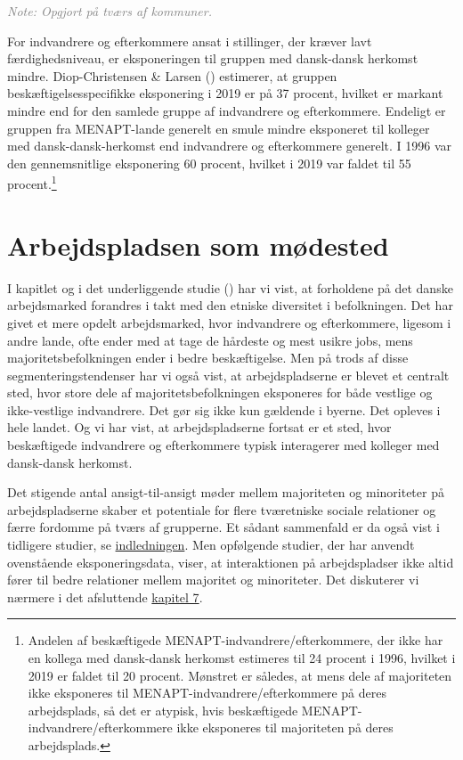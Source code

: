 \documentclass[
]{book}
\begin{document}
\begin{footnotesize}\textit{\textcolor{gray}{
Note: Opgjort på tværs af kommuner.
}}
\end{footnotesize}

For indvandrere og efterkommere ansat i stillinger, der kræver lavt færdighedsniveau, er eksponeringen til gruppen med dansk-dansk herkomst mindre. Diop-Christensen \& Larsen () estimerer, at gruppen beskæftigelsesspecifikke eksponering i 2019 er på 37 procent, hvilket er markant mindre end for den samlede gruppe af indvandrere og efterkommere. Endeligt er gruppen fra MENAPT-lande generelt en smule mindre eksponeret til kolleger med dansk-dansk-herkomst end indvandrere og efterkommere generelt. I 1996 var den gennemsnitlige eksponering 60 procent, hvilket i 2019 var faldet til 55 procent.\footnote{Andelen af beskæftigede MENAPT-indvandrere/efterkommere, der ikke har en kollega med dansk-dansk herkomst estimeres til 24 procent i 1996, hvilket i 2019 er faldet til 20 procent. Mønstret er således, at mens dele af majoriteten ikke eksponeres til MENAPT-indvandrere/efterkommere på deres arbejdsplads, så det er atypisk, hvis beskæftigede MENAPT-indvandrere/efterkommere ikke eksponeres til majoriteten på deres arbejdsplads.}

\section{Arbejdspladsen som mødested}\label{arbejdspladsen-som-muxf8dested}

I kapitlet og i det underliggende studie () har vi vist, at forholdene på det danske arbejdsmarked forandres i takt med den etniske diversitet i befolkningen. Det har givet et mere opdelt arbejdsmarked, hvor indvandrere og efterkommere, ligesom i andre lande, ofte ender med at tage de hårdeste og mest usikre jobs, mens majoritetsbefolkningen ender i bedre beskæftigelse. Men på trods af disse segmenteringstendenser har vi også vist, at arbejdspladserne er blevet et centralt sted, hvor store dele af majoritetsbefolkningen eksponeres for både vestlige og ikke-vestlige indvandrere. Det gør sig ikke kun gældende i byerne. Det opleves i hele landet. Og vi har vist, at arbejdspladserne fortsat er et sted, hvor beskæftigede indvandrere og efterkommere typisk interagerer med kolleger med dansk-dansk herkomst.

Det stigende antal ansigt-til-ansigt møder mellem majoriteten og minoriteter på arbejdspladserne skaber et potentiale for flere tværetniske sociale relationer og færre fordomme på tværs af grupperne. Et sådant sammenfald er da også vist i tidligere studier, se \hyperref[indledning]{indledningen}. Men opfølgende studier, der har anvendt ovenstående eksponeringsdata, viser, at interaktionen på arbejdspladser ikke altid fører til bedre relationer mellem majoritet og minoriteter. Det diskuterer vi nærmere i det afsluttende \hyperref[kap7]{kapitel 7}.
\end{document}
